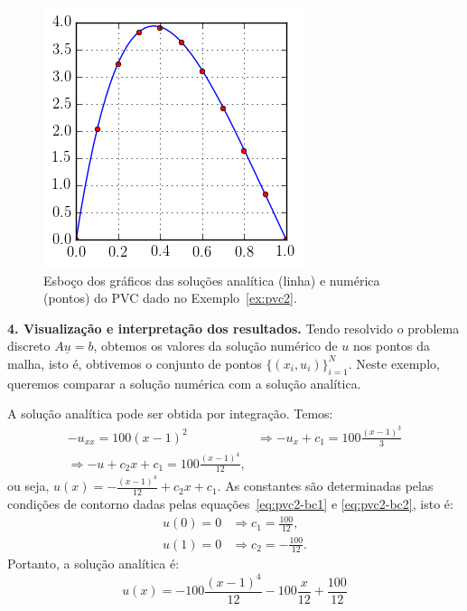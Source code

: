 \begin{sol}
\begin{figure}
  \centering
  \includegraphics{./cap_pvc/pics/ex_pvc2/ex_pvc2}
  \caption{Esboço dos gráficos das soluções analítica (linha) e numérica (pontos) do PVC dado no Exemplo~\ref{ex:pvc2}.}
  \label{fig:ex_pvc2}
\end{figure}

{\bf 4. Visualização e interpretação dos resultados.} Tendo resolvido o problema discreto $A\underline{u} = b$, obtemos os valores da solução numérico de $u$ nos pontos da malha, isto é, obtivemos o conjunto de pontos $\{(x_i, u_i)\}_{i=1}^N$. Neste exemplo, queremos comparar a solução numérica com a solução analítica.

A solução analítica pode ser obtida por integração. Temos:
\begin{equation}
  \begin{split}
    -u_{xx} = 100(x-1)^2 &\Rightarrow -u_x + c_1 = 100\frac{(x-1)^3}{3}\\
    \Rightarrow -u + c_2x + c_1 = 100\frac{(x-1)^4}{12},
  \end{split}
\end{equation}
ou seja, $\displaystyle u(x) = - \frac{(x-1)^4}{12} + c_2x + c_1$. As constantes são determinadas pelas condições de contorno dadas pelas equações~\eqref{eq:pvc2-bc1} e \eqref{eq:pvc2-bc2}, isto é:
\begin{equation}
  \begin{split}
    u(0) = 0 &\Rightarrow c_1 = \frac{100}{12},\\
    u(1) = 0 &\Rightarrow c_2 = -\frac{100}{12}.
  \end{split}
\end{equation}
Portanto, a solução analítica é:
\begin{equation}\label{eq:pvc2_analitica}
  u(x) = -100\frac{(x-1)^4}{12} - 100\frac{x}{12} + \frac{100}{12}
\end{equation}


\end{sol}

